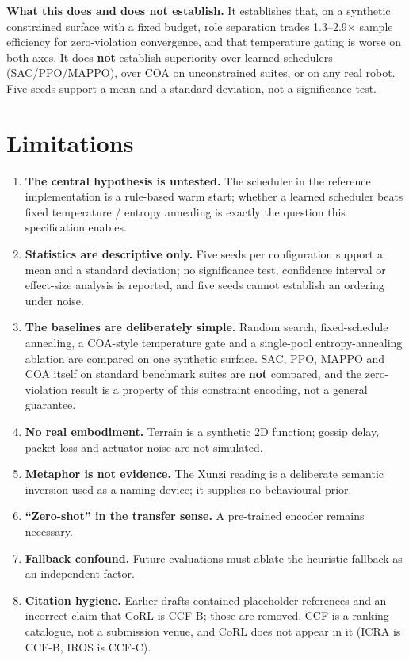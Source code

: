 \documentclass[11pt,a4paper]{article}
\begin{document}
\textbf{What this does and does not establish.} It establishes that, on a synthetic constrained surface with a fixed budget, role separation trades 1.3--2.9$\times$ sample efficiency for zero-violation convergence, and that temperature gating is worse on both axes. It does \textbf{not} establish superiority over learned schedulers (SAC/PPO/MAPPO), over COA on unconstrained suites, or on any real robot. Five seeds support a mean and a standard deviation, not a significance test.

\section{Limitations}
\begin{enumerate}
\item \textbf{The central hypothesis is untested.} The scheduler in the reference implementation is a rule-based warm start; whether a learned scheduler beats fixed temperature / entropy annealing is exactly the question this specification enables.
\item \textbf{Statistics are descriptive only.} Five seeds per configuration support a mean and a standard deviation; no significance test, confidence interval or effect-size analysis is reported, and five seeds cannot establish an ordering under noise.
\item \textbf{The baselines are deliberately simple.} Random search, fixed-schedule annealing, a COA-style temperature gate and a single-pool entropy-annealing ablation are compared on one synthetic surface. SAC, PPO, MAPPO and COA itself on standard benchmark suites are \textbf{not} compared, and the zero-violation result is a property of this constraint encoding, not a general guarantee.
\item \textbf{No real embodiment.} Terrain is a synthetic 2D function; gossip delay, packet loss and actuator noise are not simulated.
\item \textbf{Metaphor is not evidence.} The Xunzi reading is a deliberate semantic inversion used as a naming device; it supplies no behavioural prior.
\item \textbf{``Zero-shot'' in the transfer sense.} A pre-trained encoder remains necessary.
\item \textbf{Fallback confound.} Future evaluations must ablate the heuristic fallback as an independent factor.
\item \textbf{Citation hygiene.} Earlier drafts contained placeholder references and an incorrect claim that CoRL is CCF-B; those are removed. CCF is a ranking catalogue, not a submission venue, and CoRL does not appear in it (ICRA is CCF-B, IROS is CCF-C).
\end{enumerate}
\end{document}
